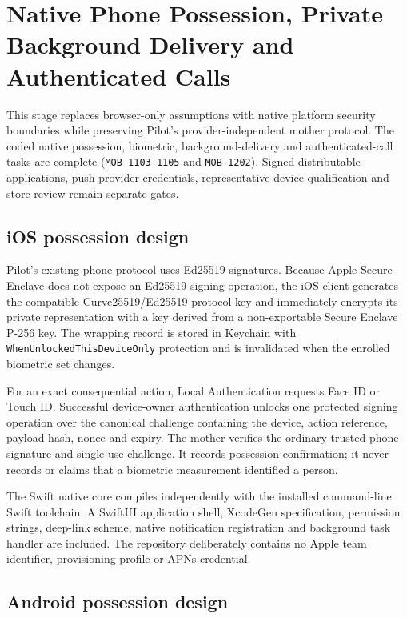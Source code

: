 \section{Native Phone Possession, Private Background Delivery and Authenticated Calls}
\label{sec:pilot-native-possession-background-webrtc}

This stage replaces browser-only assumptions with native platform security boundaries
while preserving Pilot's provider-independent mother protocol.  The coded native
possession, biometric, background-delivery and authenticated-call tasks are complete
(\texttt{MOB-1103--1105} and \texttt{MOB-1202}).  Signed distributable applications, push-provider credentials,
representative-device qualification and store review remain separate gates.

\subsection{iOS possession design}

Pilot's existing phone protocol uses Ed25519 signatures.  Because Apple Secure
Enclave does not expose an Ed25519 signing operation, the iOS client generates the
compatible Curve25519/Ed25519 protocol key and immediately encrypts its private
representation with a key derived from a non-exportable Secure Enclave P-256 key.
The wrapping record is stored in Keychain with
\texttt{WhenUnlockedThisDeviceOnly} protection and is invalidated when the enrolled
biometric set changes.

For an exact consequential action, Local Authentication requests Face ID or Touch ID.
Successful device-owner authentication unlocks one protected signing operation over
the canonical challenge containing the device, action reference, payload hash, nonce
and expiry.  The mother verifies the ordinary trusted-phone signature and single-use
challenge.  It records possession confirmation; it never records or claims that a
biometric measurement identified a person.

The Swift native core compiles independently with the installed command-line Swift
toolchain.  A SwiftUI application shell, XcodeGen specification, permission strings,
deep-link scheme, native notification registration and background task handler are
included.  The repository deliberately contains no Apple team identifier,
provisioning profile or APNs credential.

\subsection{Android possession design}

